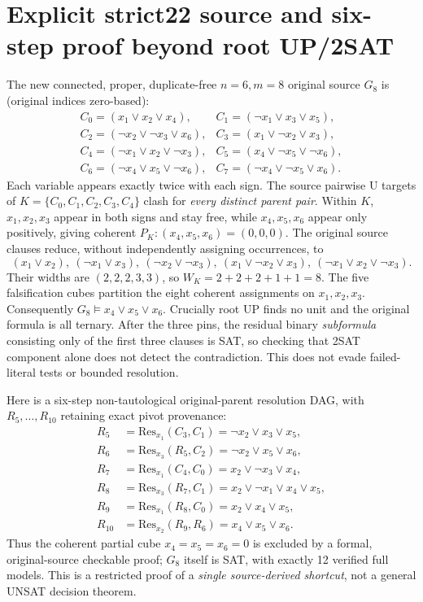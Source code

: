 \documentclass[10pt]{article}
\begin{document}
\section{Explicit strict22 source and six-step proof beyond root UP/2SAT}
The new connected, proper, duplicate-free $n=6,m=8$ original source $G_8$ is (original indices zero-based):
\[
\begin{array}{llll}
 C_0=(x_1\vee x_2\vee x_4),& C_1=(\neg x_1\vee x_3\vee x_5),\\
 C_2=(\neg x_2\vee\neg x_3\vee x_6),& C_3=(x_1\vee\neg x_2\vee x_3),\\
 C_4=(\neg x_1\vee x_2\vee\neg x_3),& C_5=(x_4\vee\neg x_5\vee\neg x_6),\\
 C_6=(\neg x_4\vee x_5\vee\neg x_6),& C_7=(\neg x_4\vee\neg x_5\vee x_6).
\end{array}
\]
Each variable appears exactly twice with each sign. The source pairwise U targets of $K=\{C_0,C_1,C_2,C_3,C_4\}$ clash for \emph{every distinct parent pair}. Within $K$, $x_1,x_2,x_3$ appear in both signs and stay free, while $x_4,x_5,x_6$ appear only positively, giving coherent $P_K:(x_4,x_5,x_6)=(0,0,0)$. The original source clauses reduce, without independently assigning occurrences, to
\[
(x_1\vee x_2),\ (\neg x_1\vee x_3),\ (\neg x_2\vee\neg x_3),\ (x_1\vee\neg x_2\vee x_3),\ (\neg x_1\vee x_2\vee\neg x_3).
\]
Their widths are $(2,2,2,3,3)$, so $W_K=2+2+2+1+1=8$. The five falsification cubes partition the eight coherent assignments on $x_1,x_2,x_3$. Consequently $G_8\models x_4\vee x_5\vee x_6$. Crucially root UP finds no unit and the original formula is all ternary. After the three pins, the residual binary \emph{subformula} consisting only of the first three clauses is SAT, so checking that 2SAT component alone does not detect the contradiction. This does not evade failed-literal tests or bounded resolution.

Here is a six-step non-tautological original-parent resolution DAG, with $R_5,\ldots,R_{10}$ retaining exact pivot provenance:
\[
\begin{aligned}
R_5&=\mathrm{Res}_{x_1}(C_3,C_1)=\neg x_2\vee x_3\vee x_5,\\
R_6&=\mathrm{Res}_{x_3}(R_5,C_2)=\neg x_2\vee x_5\vee x_6,\\
R_7&=\mathrm{Res}_{x_1}(C_4,C_0)=x_2\vee\neg x_3\vee x_4,\\
R_8&=\mathrm{Res}_{x_3}(R_7,C_1)=x_2\vee\neg x_1\vee x_4\vee x_5,\\
R_9&=\mathrm{Res}_{x_1}(R_8,C_0)=x_2\vee x_4\vee x_5,\\
R_{10}&=\mathrm{Res}_{x_2}(R_9,R_6)=x_4\vee x_5\vee x_6.
\end{aligned}
\]
Thus the coherent partial cube $x_4=x_5=x_6=0$ is excluded by a formal, original-source checkable proof; $G_8$ itself is SAT, with exactly 12 verified full models. This is a restricted proof of a \emph{single source-derived shortcut}, not a general UNSAT decision theorem.
\end{document}
